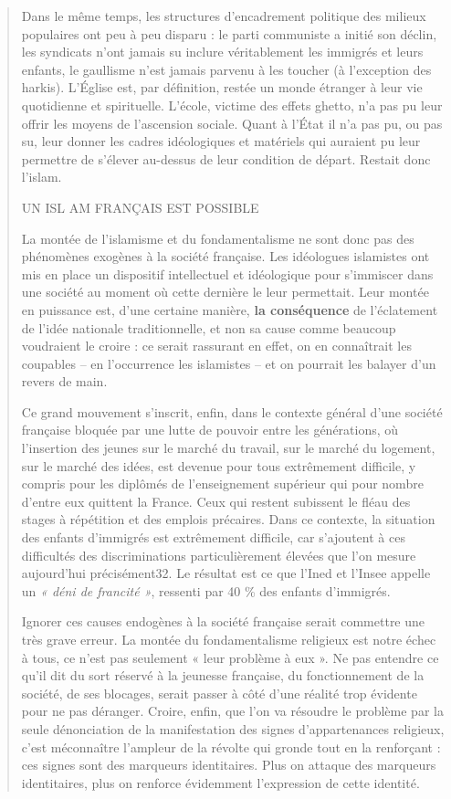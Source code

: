 \begin{quote}
Dans le même temps, les structures d'encadrement politique des milieux
populaires ont peu à peu disparu : le parti communiste a initié son
déclin, les syndicats n'ont jamais su inclure véritablement les immigrés
et leurs enfants, le gaullisme n'est jamais parvenu à les toucher (à
l'exception des harkis). L'Église est, par définition, restée un monde
étranger à leur vie quotidienne et spirituelle. L'école, victime des
effets ghetto, n'a pas pu leur offrir les moyens de l'ascension sociale.
Quant à l'État il n'a pas pu, ou pas su, leur donner les cadres
idéologiques et matériels qui auraient pu leur permettre de s'élever
au-dessus de leur condition de départ. Restait donc l'islam.

UN ISL AM FRANÇAIS EST POSSIBLE

La montée de l'islamisme et du fondamentalisme ne sont donc pas des
phénomènes exogènes à la société française. Les idéologues islamistes
ont mis en place un dispositif intellectuel et idéologique pour
s'immiscer dans une société au moment où cette dernière le leur
permettait. Leur montée en puissance est, d'une certaine manière,
\textbf{la conséquence} de l'éclatement de l'idée nationale
traditionnelle, et non sa cause comme beaucoup voudraient le croire : ce
serait rassurant en effet, on en connaîtrait les coupables -- en
l'occurrence les islamistes -- et on pourrait les balayer d'un revers de
main.

Ce grand mouvement s'inscrit, enfin, dans le contexte général d'une
société française bloquée par une lutte de pouvoir entre les
générations, où l'insertion des jeunes sur le marché du travail, sur le
marché du logement, sur le marché des idées, est devenue pour tous
extrêmement difficile, y compris pour les diplômés de l'enseignement
supérieur qui pour nombre d'entre eux quittent la France. Ceux qui
restent subissent le fléau des stages à répétition et des emplois
précaires. Dans ce contexte, la situation des enfants d'immigrés est
extrêmement difficile, car s'ajoutent à ces difficultés des
discriminations particulièrement élevées que l'on mesure aujourd'hui
précisément32. Le résultat est ce que l'Ined et l'Insee appelle un
\emph{« déni de francité »}, ressenti par 40 \% des enfants d'immigrés.

Ignorer ces causes endogènes à la société française serait commettre une
très grave erreur. La montée du fondamentalisme religieux est notre
échec à tous, ce n'est pas seulement « leur problème à eux ». Ne pas
entendre ce qu'il dit du sort réservé à la jeunesse française, du
fonctionnement de la société, de ses blocages, serait passer à côté
d'une réalité trop évidente pour ne pas déranger. Croire, enfin, que
l'on va résoudre le problème par la seule dénonciation de la
manifestation des signes d'appartenances religieux, c'est méconnaître
l'ampleur de la révolte qui gronde tout en la renforçant : ces signes
sont des marqueurs identitaires. Plus on attaque des marqueurs
identitaires, plus on renforce évidemment l'expression de cette
identité.


\end{quote}
